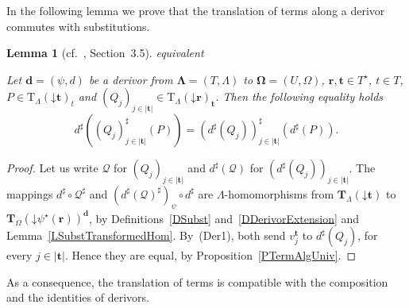 \documentclass[a4paper, reqno]{amsbook}
\makeatletter
\newcommand{\bb}[1]{\ensuremath{\lvert #1 \rvert}}
\newcommand{\vs}[1]{\mathbin{\downarrow}#1}
\newcommand{\sig}[1]{\mathbf{#1}}             %
\theoremstyle{plain}
\newtheorem{lemma}[theorem]{Lemma}
\theoremstyle{definition}
\newcommand*{\CA@leanpending}{}
\newcommand*{\CA@leanrelation}{}
\newcommand*{\lean}[2]{%
  \ifcsname\string\color@lean@#1\endcsname\else
    \PackageError{main}{Unknown relation `#1' in \string\lean}{Use equivalent, weaker or stronger.}%
  \fi
  \gdef\CA@leanrelation{#1}%
  \gdef\CA@leanpending{#2}}
\makeatother
\begin{document}
In the following lemma we prove that the translation of terms along a derivor commutes with substitutions.

\begin{lemma}[cf.~\cite{Soliveres2000}, Section~3.5]\label{LDerivorSubst}\lean{equivalent}{Derivor.translate_word_subst_family}
Let $\mathbf{d}=(\psi,d)$ be a derivor from $\sig{\Lambda}=(T,\Lambda)$ to $\sig{\Omega}=(U,\Omega)$, $\mathbf{r},\mathbf{t}\in T^{\star}$, $t\in T$, $P\in\mathrm{T}_{\Lambda}(\vs{\mathbf{t}})_{t}$ and $(Q_{j})_{j\in\bb{\mathbf{t}}}\in\mathrm{T}_{\Lambda}(\vs{\mathbf{r}})_{\mathbf{t}}$.
Then the following equality holds
$$
d^{\sharp}\left((Q_{j})^{\sharp}_{j\in\bb{\mathbf{t}}}(P)\right)=\left(d^{\sharp}(Q_{j})\right)^{\sharp}_{j\in\bb{\mathbf{t}}}\left(d^{\sharp}(P)\right).
$$
\end{lemma}
\begin{proof}
Let us write $\mathcal{Q}$ for $(Q_{j})_{j\in\bb{\mathbf{t}}}$ and $d^{\sharp}(\mathcal{Q})$ for $(d^{\sharp}(Q_{j}))_{j\in\bb{\mathbf{t}}}$.
The mappings $d^{\sharp}\circ\mathcal{Q}^{\sharp}$ and $(d^{\sharp}(\mathcal{Q})^{\sharp})_{\psi}\circ d^{\sharp}$ are $\Lambda$-homomorphisms from $\mathbf{T}_{\Lambda}(\vs{\mathbf{t}})$ to $\mathbf{T}_{\Omega}(\vs{\psi^{\star}(\mathbf{r})})^{\mathbf{d}}$, by Definitions~\ref{DSubst} and~\ref{DDerivorExtension} and Lemma~\ref{LSubstTransformedHom}.
By~(Der1), both send $v^{\mathbf{t}}_{j}$ to $d^{\sharp}(Q_{j})$, for every $j\in\bb{\mathbf{t}}$.
Hence they are equal, by Proposition~\ref{PTermAlgUniv}.
\end{proof}

As a consequence, the translation of terms is compatible with the composition and the identities of derivors.
\end{document}
